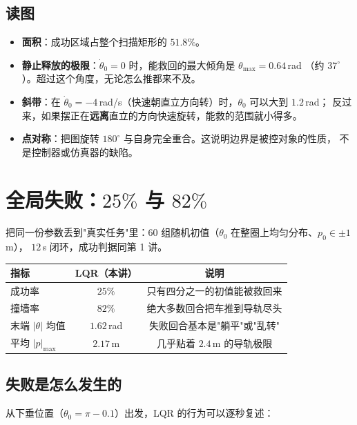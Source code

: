 \subsection{读图}

\begin{itemize}[leftmargin=2em,itemsep=3pt]
  \item \textbf{面积}：成功区域占整个扫描矩形的 $51.8\%$。
  \item \textbf{静止释放的极限}：$\dot\theta_0=0$ 时，能救回的最大倾角是 $\theta_{\max}=0.64$\,rad
        （约 $37^\circ$）。超过这个角度，无论怎么推都来不及。
  \item \textbf{斜带}：在 $\dot\theta_0=-4$\,rad/s（快速朝直立方向转）时，$\theta_0$ 可以大到 $1.2$\,rad；
        反过来，如果摆正在\textbf{远离}直立的方向快速旋转，能救的范围就小得多。
  \item \textbf{点对称}：把图旋转 $180^\circ$ 与自身完全重合。这说明边界是被控对象的性质，
        不是控制器或仿真器的缺陷。
\end{itemize}

\section{全局失败：$25\%$ 与 $82\%$}

把同一份参数丢到"真实任务"里：$60$ 组随机初值（$\theta_0$ 在整圈上均匀分布、$p_0\in\pm1$\,m），
$12$\,s 闭环，成功判据同第 1 讲。

\begin{center}
\small
\begin{tabular}{@{}lcc@{}}
\toprule
指标 & LQR（本讲） & 说明 \\
\midrule
成功率 & $25\%$ & 只有四分之一的初值能被救回来 \\
撞墙率 & $82\%$ & 绝大多数回合把车推到导轨尽头 \\
末端 $|\theta|$ 均值 & $1.62$\,rad & 失败回合基本是"躺平"或"乱转" \\
平均 $|p|_{\max}$ & $2.17$\,m & 几乎贴着 $2.4$\,m 的导轨极限 \\
\bottomrule
\end{tabular}
\end{center}

\subsection{失败是怎么发生的}

从下垂位置（$\theta_0=\pi-0.1$）出发，LQR 的行为可以逐秒复述：

